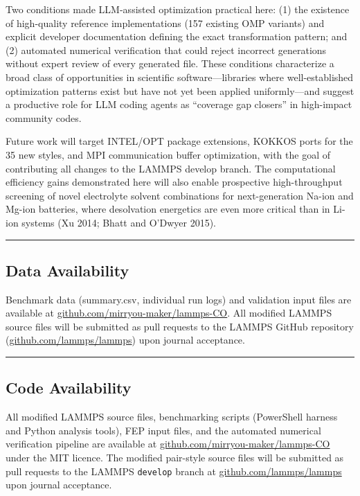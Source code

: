 \documentclass[
  11pt,
]{article}
\begin{document}
Two conditions made LLM-assisted optimization practical here: (1) the
existence of high-quality reference implementations (157 existing OMP
variants) and explicit developer documentation defining the exact
transformation pattern; and (2) automated numerical verification that
could reject incorrect generations without expert review of every
generated file. These conditions characterize a broad class of
opportunities in scientific software---libraries where well-established
optimization patterns exist but have not yet been applied
uniformly---and suggest a productive role for LLM coding agents as
``coverage gap closers'' in high-impact community codes.

Future work will target INTEL/OPT package extensions, KOKKOS ports for
the 35 new styles, and MPI communication buffer optimization, with the
goal of contributing all changes to the LAMMPS develop branch. The
computational efficiency gains demonstrated here will also enable
prospective high-throughput screening of novel electrolyte solvent
combinations for next-generation Na-ion and Mg-ion batteries, where
desolvation energetics are even more critical than in Li-ion systems (Xu
2014; Bhatt and O'Dwyer 2015).

\begin{center}\rule{0.5\linewidth}{0.5pt}\end{center}

\subsection{Data Availability}\label{data-availability}

Benchmark data (summary.csv, individual run logs) and validation input
files are available at
\href{https://github.com/mirryou-maker/lammps-CO}{github.com/mirryou-maker/lammps-CO}.
All modified LAMMPS source files will be submitted as pull requests to
the LAMMPS GitHub repository
(\href{https://github.com/lammps/lammps}{github.com/lammps/lammps}) upon
journal acceptance.

\begin{center}\rule{0.5\linewidth}{0.5pt}\end{center}

\subsection{Code Availability}\label{code-availability}

All modified LAMMPS source files, benchmarking scripts (PowerShell
harness and Python analysis tools), FEP input files, and the automated
numerical verification pipeline are available at
\href{https://github.com/mirryou-maker/lammps-CO}{github.com/mirryou-maker/lammps-CO}
under the MIT licence. The modified pair-style source files will be
submitted as pull requests to the LAMMPS \texttt{develop} branch at
\href{https://github.com/lammps/lammps}{github.com/lammps/lammps} upon
journal acceptance.
\end{document}
